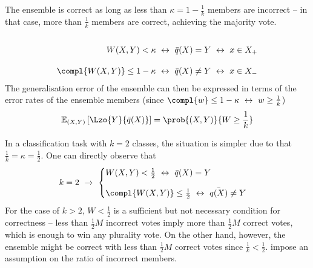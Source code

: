 \documentclass[../main.tex]{subfiles}
\begin{document}
The ensemble is correct as long as less than $\kappa = 1 - \frac{1}{k}$ members are incorrect -- in that case, more than $\frac{1}{k}$ members are correct, achieving the majority vote.
$$
\begin{align} \\
W(X,Y) < \kappa  ~\leftrightarrow~  \bar{q}(X)  = Y  ~\leftrightarrow~ x \in X_{+} \\[1em]
\compl{W(X,Y)} \leq 1-\kappa  ~\leftrightarrow~  \bar{q}(X)  \not= Y  ~\leftrightarrow~ x \in X_{-} 
\end{align}
$$
The generalisation error of the ensemble can then be expressed in terms of the error rates of the ensemble members (since $\compl{w} \leq 1-\kappa ~\leftrightarrow~ w \geq \frac{1}{k}$)
$$
\mathbb{E}_{(X,Y) }\left[ \Lzo{Y}{\bar{q}(X)} \right]  = \prob{(X,Y) }{W \geq \frac{1}{k}  }
$$

In a classification task with $k=2$ classes, the situation is simpler due to that $\frac{1}{k} = \kappa = \frac{1}{2}$. One can directly observe that
$$
k = 2 ~\rightarrow~ 
\begin{cases}
W(X,Y)  < \frac{1}{2} ~\leftrightarrow~  \bar{q}(X) = Y \\[1em]
\compl{W(X,Y) }  \leq \frac{1}{2} ~\leftrightarrow~ \bar{q(X)} \not= Y
\end{cases}
$$
For the case of $k>2$, $W < \frac{1}{2}$ is a sufficient but not necessary condition for correctness -- less than $\frac{1}{2}M$ incorrect votes imply more than $\frac{1}{2}M$ correct votes, which is enough to win any plurality vote. On the other hand, however, the ensemble might be correct with less than $\frac{1}{2}M$ correct votes since $\frac{1}{k} < \frac{1}{2}$.
\cite{theisen} impose an assumption on the ratio of incorrect members.
\end{document}
